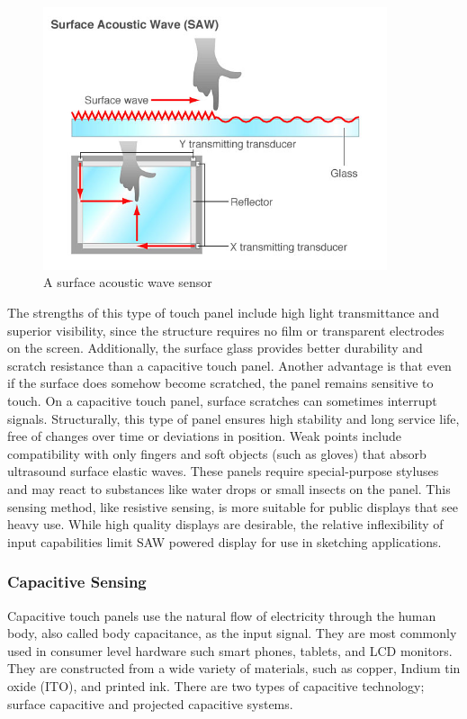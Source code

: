 \documentclass[11pt]{report}
\begin{document}
\begin{center}
\begin{figure}
\includegraphics[width=0.9\textwidth]{saw}
\caption{A surface acoustic wave sensor}
\end{figure}
\end{center}

The strengths of this type of touch panel include high light transmittance and superior visibility, since the structure requires no film or transparent electrodes on the screen. 
Additionally, the surface glass provides better durability and scratch resistance than a capacitive touch panel. 
Another advantage is that even if the surface does somehow become scratched, the panel remains sensitive to touch. 
On a capacitive touch panel, surface scratches can sometimes interrupt signals. 
Structurally, this type of panel ensures high stability and long service life, free of changes over time or deviations in position.
Weak points include compatibility with only fingers and soft objects (such as gloves) that absorb ultrasound surface elastic waves. 
These panels require special-purpose styluses and may react to substances like water drops or small insects on the panel.
This sensing method, like resistive sensing, is more suitable for public displays that see heavy use.
While high quality displays are desirable, the relative inflexibility of input capabilities limit SAW powered display for use in sketching applications.



\subsubsection{Capacitive Sensing}
Capacitive touch panels use the natural flow of electricity through the human body, also called body capacitance, as the input signal.
They are most commonly used in consumer level hardware such smart phones, tablets, and LCD monitors.
They are constructed from a wide variety of materials, such as copper, Indium tin oxide (ITO), and printed ink.
There are two types of capacitive technology; surface capacitive and projected capacitive systems.
 
\end{document}
